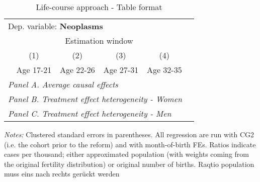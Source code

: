  \begin{table}[H] \centering \begin{threeparttable} \caption{Life-course approach - Table format} {\def\sym#1{\ifmmode^{#1}\else\(^{#1}\)\fi} \begin{tabular}{l*{5}{c}} \toprule \multicolumn{5}{l}{Dep. variable: \textbf{Neoplasms}} \\ & \multicolumn{4}{c}{Estimation window} \\ \cmidrule(lr){2-5}
            &\multicolumn{1}{c}{(1)}&\multicolumn{1}{c}{(2)}&\multicolumn{1}{c}{(3)}&\multicolumn{1}{c}{(4)}\\
            &\multicolumn{1}{c}{Age 17-21}&\multicolumn{1}{c}{Age 22-26}&\multicolumn{1}{c}{Age 27-31}&\multicolumn{1}{c}{Age 32-35}\\
\midrule
 \multicolumn{5}{l}{\emph{Panel A. Average causal effects}} \\      \midrule\multicolumn{5}{l}{\emph{Panel B. Treatment effect heterogeneity - Women}} \\      \midrule\multicolumn{5}{l}{\emph{Panel C. Treatment effect heterogeneity - Men}} \\      
\bottomrule \end{tabular} } \begin{tablenotes} \item \scriptsize \emph{Notes:} Clustered standard errors in parentheses. All regression are run with CG2 (i.e. the cohort prior to the reform) and with month-of-birth FEs. Ratios indicate cases per thousand; either approximated population (with weights coming from the original fertility distribution) or original number of births. Raqtio population muss eins nach rechts gerückt werden \end{tablenotes} \end{threeparttable} \end{table} 
